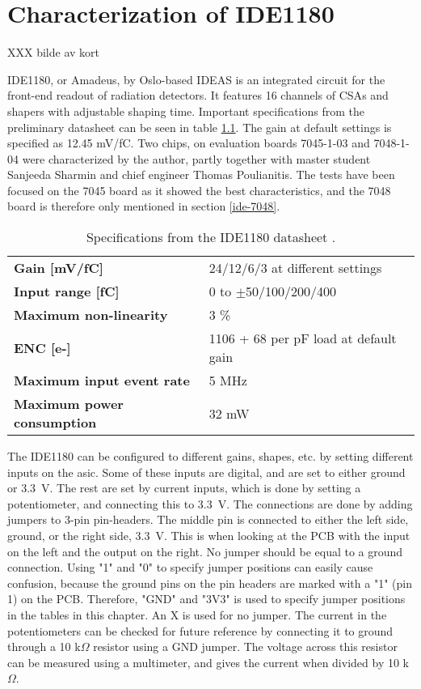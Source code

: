 \documentclass[../main/thesis.tex]{subfiles}
\begin{document}
\newchapter

\chapter{Characterization of IDE1180}
\label{ide}

XXX bilde av kort

IDE1180, or Amadeus, by Oslo-based IDEAS is an integrated circuit for the front-end readout of radiation detectors. It features 16 channels of \acrlong{CSA}s and shapers with adjustable shaping time. Important specifications from the preliminary datasheet can be seen in table \ref{tab-ide-specs}. The gain at default settings is specified as 12.45 mV/fC. Two chips, on evaluation boards 7045-1-03 and 7048-1-04 were characterized by the author, partly together with master student Sanjeeda Sharmin and chief engineer Thomas Poulianitis. The tests have been focused on the 7045 board as it showed the best characteristics, and the 7048 board is therefore only mentioned in section \ref{ide-7048}. 

\begin{table}[h!]
	\begin{center}
		\caption{Specifications from the IDE1180 datasheet \citep{IDE1180}.}
		\label{tab-ide-specs}
		\begin{tabular}{ll}\toprule
			\textbf{Gain [mV/fC]} & 24/12/6/3 at different settings  \\ 
			\textbf{Input range [fC]}     & 0 to $\pm$50/100/200/400  \\
			\textbf{Maximum non-linearity}	&	3 \%	\\
			\textbf{\gls{ENC} [e-]}		& 	1106 + 68 per pF load at default gain \\
			\textbf{Maximum input event rate}	&	5 MHz	\\
			\textbf{Maximum power consumption}	&	32 mW	\\
			 \bottomrule
		\end{tabular}
	\end{center}
\end{table}

The IDE1180 can be configured to different gains, shapes, etc. by setting different inputs on the \gls{asic}. Some of these inputs are digital, and are set to either ground or 3.3~V. The rest are set by current inputs, which is done by setting a potentiometer, and connecting this to 3.3~V. The connections are done by adding jumpers to 3-pin pin-headers. The middle pin is connected to either the left side, ground, or the right side, 3.3~V. This is when looking at the \gls{PCB} with the input on the left and the output on the right. No jumper should be equal to a ground connection. Using "1" and "0" to specify jumper positions can easily cause confusion, because the ground pins on the pin headers are marked with a "1" (pin 1) on the \gls{PCB}. Therefore, "GND" and "3V3" is used to specify jumper positions in the tables in this chapter.  An X is used for no jumper. The current in the potentiometers can be checked for future reference by connecting it to ground through a 10 k$\Omega$ resistor using a GND jumper. The voltage across this resistor can be measured using a multimeter, and gives the current when divided by 10 k$\Omega$. 
\end{document}
